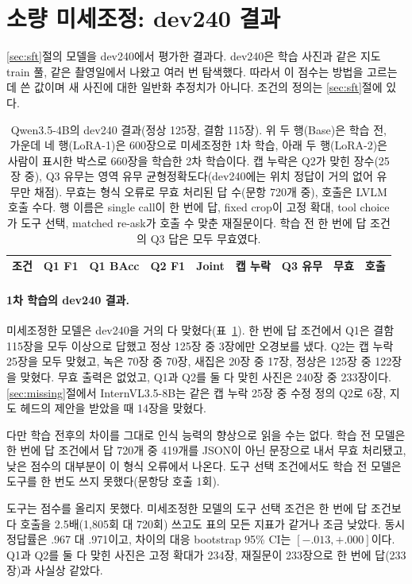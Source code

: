 \documentclass[11pt]{article}
\begin{document}
\section{소량 미세조정: dev240 결과}
\ref{sec:sft}절의 모델을 dev240에서 평가한 결과다. dev240은 학습 사진과 같은 지도 train 풀, 같은 촬영일에서 나왔고 여러 번 탐색했다. 따라서 이 점수는 방법을 고르는 데 쓴 값이며 새 사진에 대한 일반화 추정치가 아니다. 조건의 정의는 \ref{sec:sft}절에 있다.

\begin{table}[t]
\centering
\caption{Qwen3.5-4B의 dev240 결과(정상 125장, 결함 115장). 위 두 행(Base)은 학습 전, 가운데 네 행(LoRA-1)은 600장으로 미세조정한 1차 학습, 아래 두 행(LoRA-2)은 사람이 표시한 박스로 660장을 학습한 2차 학습이다. 캡 누락은 Q2가 맞힌 장수(25장 중), Q3 유무는 영역 유무 균형정확도다(dev240에는 위치 정답이 거의 없어 유무만 채점). 무효는 형식 오류로 무효 처리된 답 수(문항 720개 중), 호출은 LVLM 호출 수다. 행 이름은 single call이 한 번에 답, fixed crop이 고정 확대, tool choice가 도구 선택, matched re-ask가 호출 수 맞춘 재질문이다. 학습 전 한 번에 답 조건의 Q3 답은 모두 무효였다.}
\label{tab:sft}
\small
\begin{tabular}{lrrrrrrrr}
\toprule
조건 & Q1 F1 & Q1 BAcc & Q2 F1 & Joint & 캡 누락 & Q3 유무 & 무효 & 호출 \\
\midrule

\bottomrule
\end{tabular}
\end{table}

\paragraph{1차 학습의 dev240 결과.} 미세조정한 모델은 dev240을 거의 다 맞혔다(표~\ref{tab:sft}). 한 번에 답 조건에서 Q1은 결함 115장을 모두 이상으로 답했고 정상 125장 중 3장에만 오경보를 냈다. Q2는 캡 누락 25장을 모두 맞혔고, 녹은 70장 중 70장, 새집은 20장 중 17장, 정상은 125장 중 122장을 맞혔다. 무효 출력은 없었고, Q1과 Q2를 둘 다 맞힌 사진은 240장 중 233장이다. \ref{sec:missing}절에서 InternVL3.5-8B는 같은 캡 누락 25장 중 수정 정의 Q2로 6장, 지도 헤드의 제안을 받았을 때 14장을 맞혔다.

다만 학습 전후의 차이를 그대로 인식 능력의 향상으로 읽을 수는 없다. 학습 전 모델은 한 번에 답 조건에서 답 720개 중 419개를 JSON이 아닌 문장으로 내서 무효 처리됐고, 낮은 점수의 대부분이 이 형식 오류에서 나온다. 도구 선택 조건에서도 학습 전 모델은 도구를 한 번도 쓰지 못했다(문항당 호출 1회).

도구는 점수를 올리지 못했다. 미세조정한 모델의 도구 선택 조건은 한 번에 답 조건보다 호출을 2.5배(1,805회 대 720회) 쓰고도 표의 모든 지표가 같거나 조금 낮았다. 동시 정답률은 .967 대 .971이고, 차이의 대응 bootstrap 95\% CI는 $[-.013,+.000]$이다. Q1과 Q2를 둘 다 맞힌 사진은 고정 확대가 234장, 재질문이 233장으로 한 번에 답(233장)과 사실상 같았다.
\end{document}
